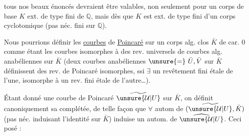 tous nos beaux énoncés devraient être valables, non seulement pour un corps de base $K$ ext. de type fini de $\mathbb{Q}$, mais dès que $K$ est ext. de type fini d'un corps cyclotomique (pas néc. fini sur $\mathbb{Q}$).

Nous pourrions définir les \uline{courbes} de \uline{Poincaré} sur un corps alg. clos $\bar K$ de car. $0$ comme étant les courbes isomorphes à des rev. universels de courbes alg. anabéliennes sur $\bar K$ (deux courbes anabéliennes $\unsure{=}\ \bar U,\bar V$ sur $\bar K$ définissent des rev. de Poincaré isomorphes, ssi $\exists$ un revêtement fini étale de l'une, isomorphe à un rev. fini étale de l'autre\ldots).

Étant donné une courbe de Poincaré $\widetilde{\unsure{\mathcal U|U}}$ sur $\bar K$,  on définit canoniquement sa complétée, de telle façon que $\forall$ autom de $(\widetilde{\unsure{\mathcal U|U}},\bar K)$ (pas néc. induisant l'identité sur $\bar K$) induise un autom. de $\widehat{\unsure{\mathcal U|U}}$.
Ceci posé :
